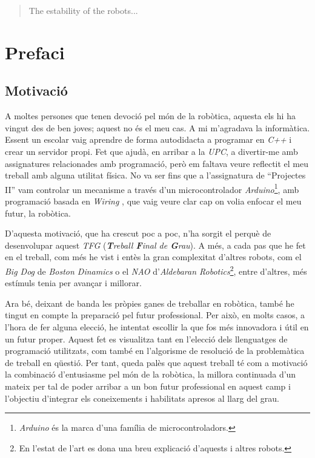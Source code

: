 \documentclass[12pt,a4paper,final,twoside]{article}
\begin{document}
\renewcommand{\abstractname}{Abstract}
\begin{abstract}
The estability of the robots...
\end{abstract}
\newpage
\cleardoublepage

\tableofcontents
\newpage
\listoffigures
\newpage
\listoftables
\newpage



\section*{Prefaci}
\label{Prefaci}


\subsection*{Motivació}
\label{Motivacio}

A moltes persones que tenen devoció pel món de la robòtica, aquesta els hi ha vingut des de ben joves; aquest no és el meu cas. A mi m'agradava la informàtica. Essent un escolar vaig aprendre de forma autodidacta a programar en \textit{C++} i crear un servidor propi. Fet que ajudà, en arribar a la \textit{UPC}, a divertir-me amb assignatures relacionades amb programació, però em faltava veure reflectit el meu treball amb alguna utilitat física. No va ser fins que a l'assignatura de ``Projectes II'' vam controlar un mecanisme a través d'un microcontrolador \textit{Arduino}\footnote{\textit{Arduino} és la marca d'una família de microcontroladors.}, amb programació basada en \textit{Wiring} \cite{Arduino}, que vaig veure clar cap on volia enfocar el meu futur, la robòtica.

D'aquesta motivació, que ha crescut poc a poc, n'ha sorgit el perquè de desenvolupar aquest \textit{TFG} (\textit{\textbf{T}reball \textbf{F}inal de \textbf{G}rau}). A més, a cada pas que he fet en el treball, com més he vist i entès la gran complexitat d'altres robots, com el \textit{Big Dog} de \textit{Boston Dinamics} o el \textit{NAO} d'\textit{Aldebaran Robotics}\footnote{En l'estat de l'art es dona una breu explicació d'aquests i altres robots.}, entre d'altres, més estímuls tenia per avançar i millorar.

Ara bé, deixant de banda les pròpies ganes de treballar en robòtica, també he tingut en compte la preparació pel futur professional. Per això, en molts casos, a l'hora de fer alguna elecció, he intentat escollir la que fos més innovadora i útil en un futur proper. Aquest fet es visualitza tant en l'elecció dels llenguatges de programació utilitzats, com també en l'algorisme de resolució de la problemàtica de treball en qüestió. Per tant, queda palès que aquest treball té com a motivació la combinació d'entusiasme pel món de la robòtica, la millora continuada d'un mateix per tal de poder arribar a un bon futur professional en aquest camp i l'objectiu d'integrar els coneixements i habilitats apresos al llarg del grau.
\end{document}
